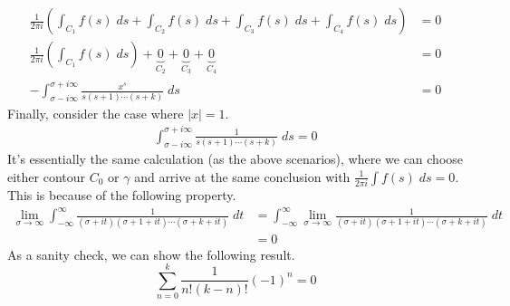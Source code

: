 \begin{align*}
    \frac{1}{2\pi i} \left(\int_{C_1} f(s)\;ds + \int_{C_2} f(s)\;ds + \int_{C_3} f(s)\;ds + \int_{C_4} f(s)\;ds \right)&= 0\\
    \frac{1}{2\pi i} \left(\int_{C_1} f(s)\;ds\right) + \underbrace{0}_{C_2} + \underbrace{0}_{C_3} + \underbrace{0}_{C_4} &= 0\\
    -\int_{\sigma - i\infty}^{\sigma + i\infty} \frac{x^s}{s(s+1)\cdots(s+k)}\;ds &= 0
\end{align*}
Finally, consider the case where $|x| = 1$. 
\begin{align*}
    \int_{\sigma - i\infty}^{\sigma + i\infty} \frac{1}{s(s+1)\cdots(s+k)}\;ds = 0
\end{align*}
It's essentially the same calculation (as the above scenarios), where we can choose either contour $C_0$ or $\gamma$ and arrive at the same conclusion with $\frac{1}{2\pi i} \int f(s)\;ds = 0$. This is because of the following property.
\begin{align*}
     \lim_{\sigma \rightarrow \infty} \int_{-\infty}^{\infty} \frac{1}{(\sigma + it)(\sigma + 1 + it) \cdots (\sigma + k + it) }\;dt &=  \int_{-\infty}^{\infty} \lim_{\sigma \rightarrow \infty} \frac{1}{(\sigma + it)(\sigma + 1 + it) \cdots (\sigma + k + it) }\;dt\\
     &= 0
\end{align*}
As a sanity check, we can show the following result.
$$
\sum_{n=0}^k \frac{1}{n!(k-n)!} (-1)^n = 0
$$